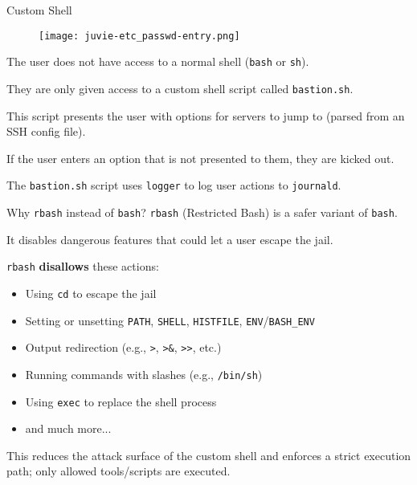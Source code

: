 \documentclass[14pt,compress,dvipsnames,aspectratio=169]{beamer} %
\begin{document}
\begin{frame}{Custom Shell}
    \begin{figure}
        \centering
        \texttt{[image: juvie-etc\_passwd-entry.png]}
    \end{figure}
    The user does not have access to a normal shell (\texttt{bash} or \texttt{sh}).
    \vspace{0.25cm}

    They are only given access to a custom shell script called \texttt{bastion.sh}.  
    \vspace{0.25cm}

    This script presents the user with options for servers to jump to (parsed from an
    SSH config file).  
    \vspace{0.25cm}

    If the user enters an option that is not presented to them, they are kicked out.  
    \vspace{0.25cm}

    The \texttt{bastion.sh} script uses \texttt{logger} to log user actions to
    \texttt{journald}.  
\end{frame}


\begin{frame}{Why \texttt{rbash} instead of \texttt{bash}?}
    \texttt{rbash} (Restricted Bash) is a safer variant of \texttt{bash}.  

    It disables dangerous features that could let a user escape the jail.  

    \texttt{rbash} \textbf{disallows} these actions:
    \begin{itemize}
        \item{Using \texttt{cd} to escape the jail} 
        \item{Setting or unsetting \texttt{PATH}, \texttt{SHELL}, \texttt{HISTFILE}, \texttt{ENV}/\texttt{BASH\_ENV} }
        \item{Output redirection (e.g., \texttt{>}, \texttt{>\&}, \texttt{>>}, etc.)} 
        \item{Running commands with slashes (e.g., \texttt{/bin/sh})} 
        \item{Using \texttt{exec} to replace the shell process} 
        \item{and much more...} 
    \end{itemize}
    This reduces the attack surface of the custom shell and enforces a strict execution
    path; only allowed tools/scripts are executed.  
\end{frame}
\end{document}
